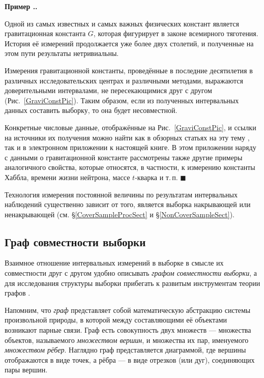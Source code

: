 \documentclass[a5paper,openany]{book}
\newcounter{ExmpNum}[section]
\renewcommand{\theExmpNum}{\thesection.\arabic{ExmpNum}}
\newenvironment{example}%
  {\refstepcounter{ExmpNum}%
  \par\addvspace{\medskipamount} 
  \noindent\textbf{Пример {\theExmpNum}.}
  }%
  {\hfill$\blacksquare$\par\medskip}
\begin{document}
  
\begin{example} 
Одной из самых известных и самых важных физических констант является гравитационная 
константа $G$, которая фигурирует в законе всемирного тяготения. История её измерений 
продолжается уже более двух столетий, и полученные на этом пути результаты нетривиальны. 
  
Измерения гравитационной константы, проведённые в последние десятилетия в различных 
исследовательских центрах и различными методами, выражаются доверительными интервалами, 
не пересекающимися друг с другом (Рис.~\ref{GraviConstPic}). Таким образом, если 
из полученных интервальных данных составить выборку, то она будет несовместной. 
  
Конкретные числовые данные, отображённые на Рис.~\ref{GraviConstPic}, и ссылки 
на источники их получения можно найти как в обзорных статьях на эту тему 
\cite{GraviConstChina, GraviConstItaly}, так и в электронном приложении 
\cite{IntervalAnalysisExamples} к настоящей книге. В этом приложении наряду 
с данными о гравитационной константе рассмотрены также другие примеры аналогичного 
свойства, которые относятся, в частности, к измерению константы Хаббла, времени 
жизни нейтрона, массе $t$-кварка и т.\,п.     %
\end{example}
  
Технология измерения постоянной величины по результатам интервальных наблюдений 
существенно зависит от того, является выборка накрывающей или ненакрывающей 
(см. \S\ref{CoverSampleProcSect} и \S\ref{NonCoverSampleSect}). 


  
\subsection{Граф совместности выборки} 
\label{CompatibilityGraph} 
  
Взаимное отношение интервальных измерений в выборке в смысле их совместности друг 
с другом удобно описывать \emph{графом совместности выборки},  а для исследования структуры выборки прибегать к развитым инструментам теории 
графов \cite{Zykov,Roberts}. 

Напомним, что \emph{граф} представляет собой математическую абстракцию системы 
произвольной природы, в которой между составляющими её объектами возникают парные 
связи. Граф есть совокупность двух множеств --- множества объектов, называемого 
\emph{множеством вершин}, и множества их пар, именуемого \emph{множеством рёбер}. 
Наглядно граф представляется диаграммой, где вершины отображаются в виде точек, 
а рёбра --- в виде отрезков (или дуг), соединяющих пары вершин. 
  
\end{document}
